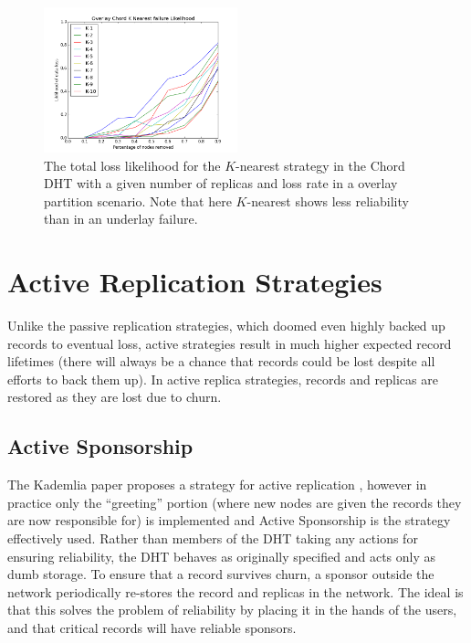 \begin{figure}[h!]
	\includegraphics[width=0.5\textwidth]{figs/overlay_chord_nearest}
	\caption{The total loss likelihood for the $K$-nearest strategy in the Chord DHT with a given number of replicas and loss rate in a overlay partition scenario. Note that here $K$-nearest shows less reliability than in an underlay failure.}
\end{figure}



\section{Active Replication Strategies}

Unlike the passive replication strategies, which doomed even highly backed up records to eventual loss, active strategies result in much higher expected record lifetimes (there will always be a chance that records could be lost despite all efforts to back them up).
In active replica strategies, records and replicas are restored as they are lost due to churn.


\subsection{Active Sponsorship}

The Kademlia paper proposes a strategy for active replication \cite{kademlia}, however in practice only the ``greeting'' portion (where new nodes are given the records they are now responsible for) is implemented and Active Sponsorship is the strategy effectively used.
Rather than members of the DHT taking any actions for ensuring reliability, the DHT behaves as originally specified and acts only as dumb storage.
To ensure that a record survives churn, a sponsor outside the network periodically re-stores the record and replicas in the network.
The ideal is that this solves the problem of reliability by placing it in the hands of the users, and that critical records will have reliable sponsors.

